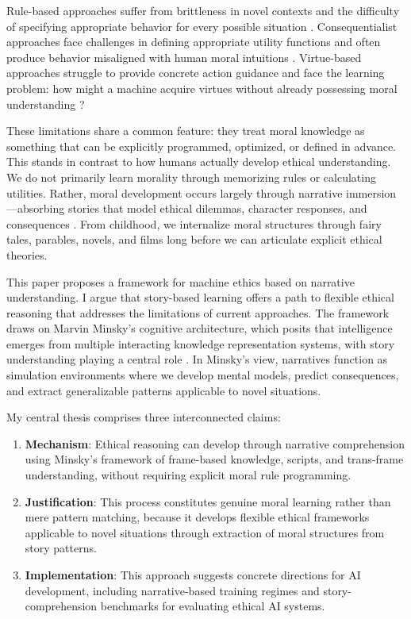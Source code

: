 \documentclass[12pt]{article}
\begin{document}
Rule-based approaches suffer from brittleness in novel contexts and the difficulty of specifying appropriate behavior for every possible situation \citep{bryson2018patiency}. Consequentialist approaches face challenges in defining appropriate utility functions and often produce behavior misaligned with human moral intuitions \citep{bostrom2014superintelligence, russell2019human}. Virtue-based approaches struggle to provide concrete action guidance and face the learning problem: how might a machine acquire virtues without already possessing moral understanding \citep{wallach2008moral}?

These limitations share a common feature: they treat moral knowledge as something that can be explicitly programmed, optimized, or defined in advance. This stands in contrast to how humans actually develop ethical understanding. We do not primarily learn morality through memorizing rules or calculating utilities. Rather, moral development occurs largely through narrative immersion—absorbing stories that model ethical dilemmas, character responses, and consequences \citep{nussbaum1990love, johnson1993moral}. From childhood, we internalize moral structures through fairy tales, parables, novels, and films long before we can articulate explicit ethical theories.

This paper proposes a framework for machine ethics based on narrative understanding. I argue that story-based learning offers a path to flexible ethical reasoning that addresses the limitations of current approaches. The framework draws on Marvin Minsky's cognitive architecture, which posits that intelligence emerges from multiple interacting knowledge representation systems, with story understanding playing a central role \citep{minsky1986society, minsky2006emotion}. In Minsky's view, narratives function as simulation environments where we develop mental models, predict consequences, and extract generalizable patterns applicable to novel situations.

My central thesis comprises three interconnected claims:

\begin{enumerate}
\item \textbf{Mechanism}: Ethical reasoning can develop through narrative comprehension using Minsky's framework of frame-based knowledge, scripts, and trans-frame understanding, without requiring explicit moral rule programming.

\item \textbf{Justification}: This process constitutes genuine moral learning rather than mere pattern matching, because it develops flexible ethical frameworks applicable to novel situations through extraction of moral structures from story patterns.

\item \textbf{Implementation}: This approach suggests concrete directions for AI development, including narrative-based training regimes and story-comprehension benchmarks for evaluating ethical AI systems.
\end{enumerate}
\end{document}
